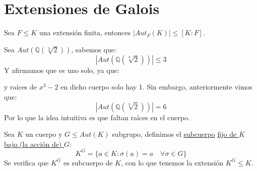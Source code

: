 \chapter{Extensiones de Galois}
\begin{prop}
    Sea $F\leq K$ una extensión finita, entonces $|Aut_F(K)| \leq [K:F]$.
\end{prop}

\begin{ejemplo}
    Sea $Aut(\mathbb{Q}(\sqrt[3]{2}))$, sabemos que:
    \begin{equation*}
        |Aut(\mathbb{Q}(\sqrt[3]{2}))| \leq 3
    \end{equation*}
    Y afirmamos que es uno solo, ya que:
    \begin{figure}[H]
        \centering
    \end{figure}
    \noindent
    y raíces de $x^3-2$ en dicho cuerpo solo hay 1. Sin embargo, anteriormente vimos que:
    \begin{equation*}
        |Aut(\mathbb{Q}(\sqrt[3]{2}))| = 6
    \end{equation*}
    Por lo que la idea intuitiva es que faltan raíces en el cuerpo.
\end{ejemplo}

\begin{definicion}
    Sea $K$ un cuerpo y $G\leq Aut(K)$ subgrupo, definimos el \underline{subcuerpo} \underline{fijo de $K$ bajo (la acción de) $G$}:
    \begin{equation*}
        K^G = \{a\in K : \sigma(a) = a \quad \forall \sigma\in G\}
    \end{equation*}
    Se verifica que $K^G$ es subcuerpo de $K$, con lo que tenemos la extensión $K^G\leq K$. %
\end{definicion}


